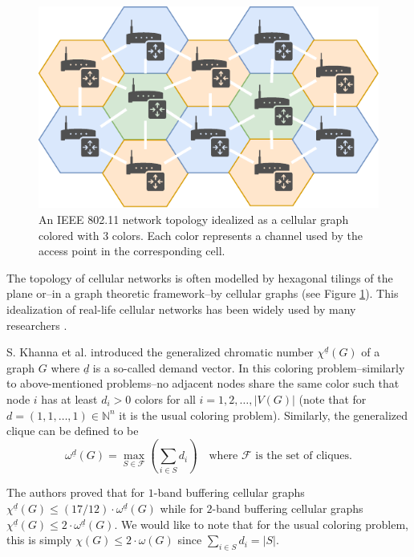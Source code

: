 \documentclass[a4paper, 12pt]{article}
\begin{document}
\begin{figure}
\centering
\includegraphics[scale=1.2]{figures/hexagonal-topology-wifi.pdf}
\caption{An IEEE 802.11 network topology idealized as a cellular graph colored with 3 colors. Each color represents a channel used by the access point in the corresponding cell.}\label{fig:hexagonal-topology-wifi}
\end{figure}

The topology of cellular networks is often modelled by hexagonal tilings of the plane or\---in a graph theoretic framework\---by cellular graphs (see Figure \ref{fig:hexagonal-topology-wifi}). This idealization of real-life cellular networks has been widely used by many researchers \cite{khanna, 7248845, 662943}.

S. Khanna et al. \cite{khanna} introduced the generalized chromatic number $\chi^{\underline{d}}(G)$ of a graph $G$ where $\underline{d}$ is a so-called demand vector. In this coloring problem\---similarly to above-mentioned problems\---no adjacent nodes share the same color such that node $i$ has at least $d_i > 0$ colors for all $i = 1,2,\ldots,|V(G)|$ (note that for $d=(1,1,\ldots,1) \in \mathbb{N}^n$ it is the usual coloring problem). Similarly, the generalized clique can be defined to be 
$$\omega^{\underline{d}}(G) = \max_{S \in \mathcal{F}}\left( \sum_{i \in S}d_i \right) \quad \text{where } \mathcal{F} \text{ is the set of cliques}.$$

The authors proved that for $1$-band buffering cellular graphs $\chi^{\underline{d}}(G) \leqslant (17/12) \cdot \omega^{\underline{d}}(G)$ while for $2$-band buffering cellular graphs $\chi^{\underline{d}}(G) \leqslant 2 \cdot \omega^{\underline{d}}(G)$.  We would like to note that for the usual coloring problem, this is simply $\chi(G) \leqslant 2 \cdot \omega(G)$ since $\sum_{i \in S}d_i = |S|$.
\end{document}
